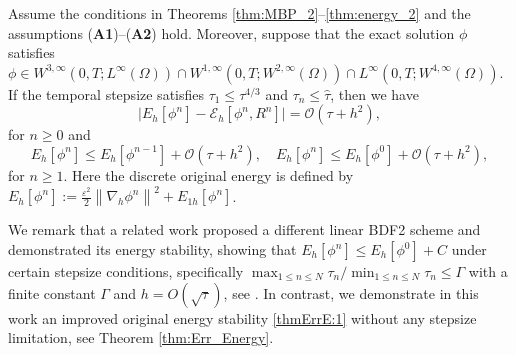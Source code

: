 \documentclass{m2an}
\newcommand{\mo}{\mathcal{O}}
\begin{document}
\begin{thrm}\label{thm:Err_Energy}
	Assume the conditions in Theorems \ref{thm:MBP_2}--\ref{thm:energy_2} and the assumptions (\textbf{A1})--(\textbf{A2}) hold. Moreover, suppose that the exact solution $ \phi $ satisfies
	$
	\phi \in W^{3,\infty}(0,T;L^{\infty}(\Omega)) \cap W^{1,\infty}(0,T;W^{2,\infty}(\Omega)) \cap L^{\infty}(0,T;W^{4,\infty}(\Omega))
	$. If the temporal stepsize satisfies $ \tau_{1} \leq \tau^{4/3} $ and  $ \tau_{n} \leq \hat{ \tau } $,
	then we have
	\begin{equation}\label{thmErrE:0}
		\big\vert E_h[\phi^{n}] - \mathcal{E}_h[\phi^{n}, R^{n}] \big\vert =\mo ( \tau + h^2 ), 
	\end{equation}
	for $ n \geq 0$ and
	\begin{equation}\label{thmErrE:1}
		E_h[\phi^{n}] \leq E_h[\phi^{n-1}] +  \mo ( \tau + h^2 ), \quad E_h[\phi^{n}] \leq E_h[\phi^{0}] +  \mo ( \tau + h^2 ),
	\end{equation}
	for $ n \geq 1$.
	Here the discrete original energy is defined by $ E_h[\phi^{n}] := \frac{\varepsilon^2}{2}\left\|\nabla_h \phi^n\right\|^2 + E_{1h}[ \phi^{n} ] $.
\end{thrm}
%
\begin{rmrk}
	We remark that a related work \cite{MOC_2023_Ju} proposed a different linear BDF2 scheme and demonstrated its energy stability, showing that $E_{h}[ \phi^{n} ] \leq E_{h}[ \phi^{0} ] + C$ under certain stepsize conditions, specifically $ \max_{1\leq n \leq N} \tau_{n} / \min_{1\leq n \leq N} \tau_{n} \leq \Gamma$ with a finite constant $ \Gamma $ and $ h = O ( \sqrt{ \tau } ) $, see \cite[Remark 4.2]{MOC_2023_Ju}. In contrast, 
	we demonstrate in this work an improved original energy stability \eqref{thmErrE:1} without any  stepsize limitation, see Theorem \ref{thm:Err_Energy}.
\end{rmrk}
\end{document}
